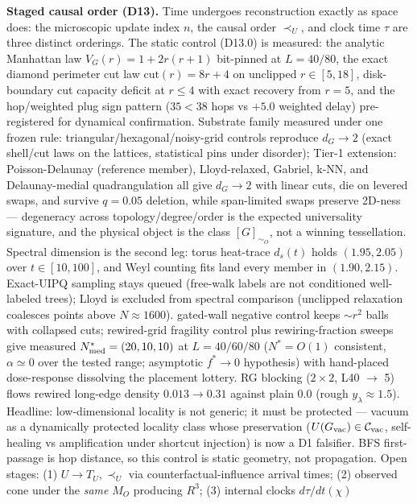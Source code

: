 \documentclass[11pt]{article}
\begin{document}
\textbf{Staged causal order (D13).} Time undergoes reconstruction exactly
as space does: the microscopic update index $n$, the causal order
$\prec_U$, and clock time $\tau$ are three distinct orderings. The
static control (D13.0) is measured: the analytic Manhattan law
$V_G(r) = 1+2r(r+1)$ bit-pinned at $L = 40/80$, the exact diamond
perimeter cut law $\mathrm{cut}(r) = 8r+4$ on unclipped $r \in [5,18]$,
disk-boundary cut capacity deficit at $r \le 4$ with exact recovery from
$r = 5$, and the hop/weighted plug sign pattern ($35 < 38$ hops vs
$+5.0$ weighted delay) pre-registered for dynamical confirmation.
Substrate family measured under one frozen rule:
triangular/hexagonal/noisy-grid controls reproduce $d_G \to 2$ (exact
shell/cut laws on the lattices, statistical pins under disorder);
Tier-1 extension: Poisson-Delaunay (reference member), Lloyd-relaxed,
Gabriel, k-NN, and Delaunay-medial quadrangulation all give $d_G \to 2$
with linear cuts, die on levered swaps, and survive $q = 0.05$ deletion,
while span-limited swaps preserve 2D-ness --- degeneracy across
topology/degree/order is the expected universality signature, and the
physical object is the class $[G]_{\sim_O}$, not a winning tessellation.
Spectral dimension is the second leg: torus heat-trace $d_s(t)$ holds
$(1.95, 2.05)$ over $t \in [10,100]$, and Weyl counting fits land every
member in $(1.90, 2.15)$. Exact-UIPQ sampling stays queued (free-walk
labels are not conditioned well-labeled trees); Lloyd is excluded from
spectral comparison (unclipped relaxation coalesces points above
$N \approx 1600$).
gated-wall negative control keeps ${\sim}r^2$ balls with collapsed
cuts; rewired-grid fragility control plus rewiring-fraction sweeps
give measured $N^*_{\rm med} = (20,10,10)$ at $L = 40/60/80$ ($N^* =
O(1)$ consistent, $\alpha \simeq 0$ over the tested range; asymptotic
$f^* \to 0$ hypothesis) with hand-placed dose-response dissolving the
placement lottery. RG blocking ($2{\times}2$, L40 $\to$ 5) flows
rewired long-edge density $0.013 \to 0.31$ against plain $0.0$
(rough $y_\lambda \approx 1.5$). Headline: low-dimensional locality is not generic;
it must be protected — vacuum as a dynamically protected locality
class whose preservation ($U(G_{\rm vac}) \in \mathcal C_{\rm vac}$,
self-healing vs amplification under shortcut injection) is now a D1
falsifier. BFS
first-passage is hop distance, so this control is static geometry, not
propagation. Open stages: (1) $U \to T_U, \prec_U$ via
counterfactual-influence arrival times; (2) observed cone under the
\emph{same} $M_O$ producing $R^3$; (3) internal clocks $d\tau/dt(\chi)$
\end{document}
